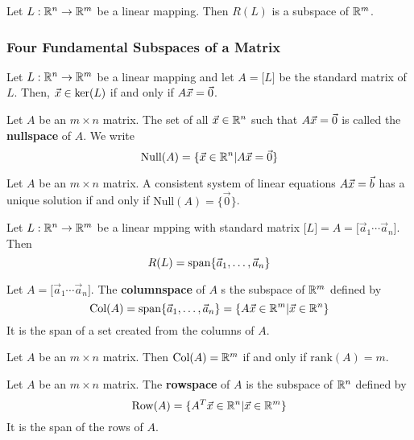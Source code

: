 \documentclass[english, 12pt]{article}
\begin{document}
\begin{thrm}
Let $L: {\mathbb{R}}^n \rightarrow {\mathbb{R}}^m$ be a linear mapping. Then $R(L)$ is a subspace of ${\mathbb{R}}^m$.
\end{thrm}

\subsubsection{Four Fundamental Subspaces of a Matrix}

\begin{thrm}
Let $L: {\mathbb{R}}^n\rightarrow{\mathbb{R}}^m$ be a linear mapping and let $A = \lbrack L \rbrack$ be the standard matrix of $L$. Then, $\vec{x} \in \text{ker}(L)$ if and only if $A\vec{x} = \vec{0}$.
\end{thrm}

\begin{defn}
Let $A$ be an $m \times n$ matrix. The set of all $\vec{x} \in {\mathbb{R}}^n$ such that $A\vec{x} = \vec{0}$ is called the \textbf{nullspace} of $A$. We write
\[\text{Null}(A) = \{\vec{x} \in {\mathbb{R}}^n | A\vec{x} = \vec{0}\}\]
\end{defn}

\begin{thrm}
Let $A$ be an $m \times n$ matrix. A consistent system of linear equations $A\vec{x} = \vec{b}$ has a unique solution if and only if $\text{Null}(A) = \{\vec{0}\}$.
\end{thrm}

\begin{thrm}
Let $L:{\mathbb{R}}^n \rightarrow {\mathbb{R}}^m$ be a linear mpping with standard matrix $\lbrack L \rbrack = A = \lbrack \vec{a}_{1} \cdots \vec{a}_{n} \rbrack$. Then
\[R(L) = \operatorname{span}\{\vec{a}_{1},\dots,\vec{a}_{n}\}\]
\end{thrm}

\begin{defn}
Let $A = \lbrack \vec{a}_{1} \cdots \vec{a}_n \rbrack$. The \textbf{columnspace} of $A$ s the subspace of ${\mathbb{R}}^m$ defined by
\[\text{Col}(A) = \operatorname{span}\{\vec{a}_1,\dots,\vec{a}_n\} = \{A\vec{x} \in {\mathbb{R}}^m | \vec{x} \in {\mathbb{R}}^n\}\]
It is the span of a set created from the columns of $A$.
\end{defn}

\begin{thrm}
Let $A$ be an $m \times n$ matrix. Then $\text{Col}(A) = {\mathbb{R}}^m$ if and only if $\text{rank}(A) = m$.
\end{thrm}

\begin{defn}
Let $A$ be an $m \times n$ matrix. The \textbf{rowspace} of $A$ is the subspace of ${\mathbb{R}}^n$ defined by
\[\text{Row}(A) = \{A^T \vec{x} \in {\mathbb{R}}^n | \vec{x} \in {\mathbb{R}}^m\}\]
It is the span of the rows of $A$.
\end{defn}
\end{document}
